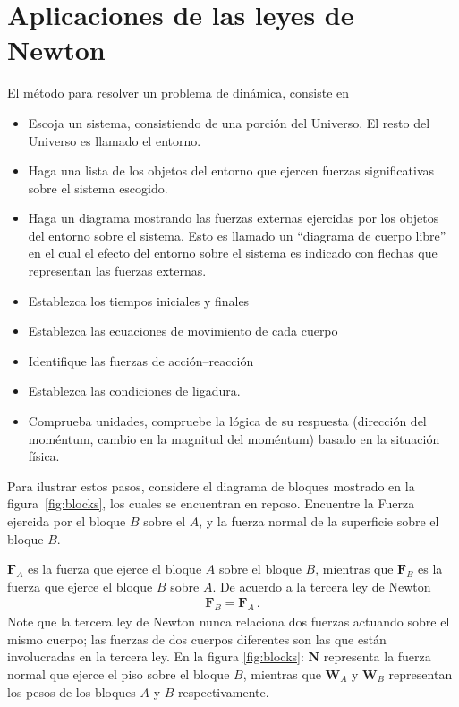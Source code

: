 \section{Aplicaciones de las leyes de Newton}
\begin{frame}
El método para resolver un problema de din\'amica, consiste en
\begin{itemize}
\item Escoja un sistema, consistiendo de una porción del Universo. El resto del Universo es llamado el entorno.
\item Haga una lista de los objetos del entorno que ejercen fuerzas significativas sobre el sistema escogido. 
\item Haga un diagrama mostrando las fuerzas externas ejercidas por los objetos del entorno sobre el sistema. Esto es llamado un ``diagrama de cuerpo libre'' en el cual el efecto del entorno sobre el sistema es indicado con flechas que representan las fuerzas externas.
\item Establezca los tiempos iniciales y finales
\item Establezca las ecuaciones de movimiento de cada cuerpo
\item Identifique las fuerzas de acci\'on--reacci\'on
\item Establezca las condiciones de ligadura.
\item Comprueba unidades, compruebe la lógica de su respuesta (dirección del moméntum, cambio en la magnitud del moméntum) basado en la situación física.
\end{itemize}
\end{frame}
 

Para ilustrar estos pasos, considere el diagrama de bloques mostrado en la figura~\ref{fig:blocks}, los cuales se encuentran en reposo. Encuentre la Fuerza ejercida por el bloque $B$ sobre el $A$, y la fuerza normal de la superficie sobre el bloque $B$.


 $\mathbf{F}_A$ es la fuerza que ejerce el bloque $A$ sobre el bloque $B$, mientras que $\mathbf{F}_B$ es la fuerza que ejerce el bloque $B$ sobre $A$. De acuerdo a la tercera ley de Newton
\begin{align}
  \mathbf{F}_B=\mathbf{F}_A\,.
\end{align}
Note que la tercera ley de Newton nunca relaciona dos fuerzas actuando sobre el mismo cuerpo; las fuerzas de dos cuerpos diferentes son las que est\'an involucradas en la tercera ley. En la figura \ref{fig:blocks}: $\mathbf{N}$ representa la fuerza normal que ejerce el piso sobre el bloque $B$, mientras que $\mathbf{W}_A$ y $\mathbf{W}_B$ representan los pesos de los bloques $A$ y $B$ respectivamente. 


